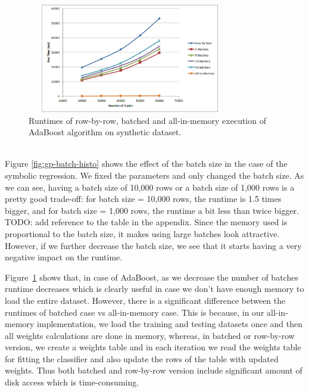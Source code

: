 \begin{figure}[ht]
\centering
\includegraphics[width=0.8\textwidth,height=180px]{ada3.png}
\caption{Runtimes of row-by-row, batched and all-in-memory execution of AdaBoost algorithm on synthetic dataset.}
\label{fig:adabatch2}
\end{figure}


~~\\
Figure \ref{fig:gp-batch-histo} shows the effect of the batch size in the case of the symbolic regression. We fixed the parameters and only changed the batch size. As we can see, having a batch size of 10,000 rows or a batch size of 1,000 rows is a pretty good trade-off: for batch size = 10,000 rows, the runtime is 1.5  times bigger, and for batch size = 1,000 rows, the runtime a bit less than twice bigger. TODO: add reference to the table in the appendix. Since the memory used is proportional to the batch size, it makes using large batches look attractive. However, if we further decrease the batch size, we see that it starts having a very negative impact on the runtime. 

Figure~\ref{fig:adabatch2} shows that, in case of AdaBoost, as we decrease the number of batches runtime decreases which is clearly useful in case we don't have enough memory to load the entire dataset. However, there is a significant difference between the runtimes of batched case vs all-in-memory case. This is because, in our all-in-memory implementation, we load the training and testing datasets once and then all weights calculations are done in memory, whereas, in batched or row-by-row version, we create a weights table and in each iteration we read the weights table for fitting the classifier and also update the rows of the table with updated weights. Thus both batched and row-by-row version include significant amount of disk access which is time-consuming. 


